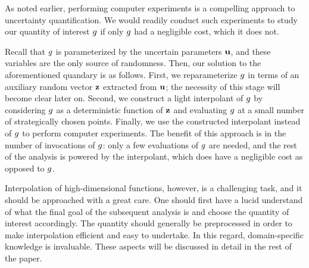 As noted earlier, performing computer experiments \cite{santner2003} is a
compelling approach to uncertainty quantification. We would readily conduct such
experiments to study our quantity of interest $g$ if only $g$ had a negligible
cost, which it does not.

Recall that $g$ is parameterized by the uncertain parameters $\mathbf{u}$, and these
variables are the only source of randomness. Then, our solution to the
aforementioned quandary is as follows. First, we reparameterize $g$ in terms of
an auxiliary random vector $\mathbf{z}$ extracted from $\mathbf{u}$; the necessity of this
stage will become clear later on. Second, we construct a light interpolant of
$g$ by considering $g$ as a deterministic function of $\mathbf{z}$ and evaluating
$g$ at a small number of strategically chosen points. Finally, we use the
constructed interpolant instead of $g$ to perform computer experiments. The
benefit of this approach is in the number of invocations of $g$: only a few
evaluations of $g$ are needed, and the rest of the analysis is powered by the
interpolant, which does have a negligible cost as opposed to $g$.

Interpolation of high-dimensional functions, however, is a challenging task, and
it should be approached with a great care. One should first have a lucid
understand of what the final goal of the subsequent analysis is and choose the
quantity of interest accordingly. The quantity should generally be preprocessed
in order to make interpolation efficient and easy to undertake. In this regard,
domain-specific knowledge is invaluable. These aspects will be discussed in
detail in the rest of the paper.
